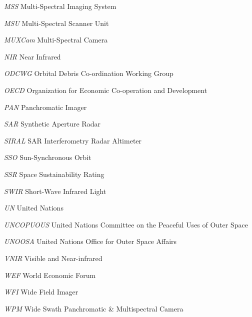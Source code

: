 \documentclass[12pt,a4paper,notitlepage,twoside,openright]{report}
\begin{document}
\begin{abbrv}
\item[\textit{MSS}] Multi-Spectral Imaging System
\item[\textit{MSU}] Multi-Spectral Scanner Unit
\item[\textit{MUXCam}] Multi-Spectral Camera
\item[\textit{NIR}] Near Infrared
\item[\textit{ODCWG}] Orbital Debris Co-ordination Working Group
\item[\textit{OECD}] Organization for Economic Co-operation and Development
\item[\textit{PAN}] Panchromatic Imager
\item[\textit{SAR}] Synthetic Aperture Radar
\item[\textit{SIRAL}] SAR Interferometry Radar Altimeter
\item[\textit{SSO}] Sun-Synchronous Orbit
\item[\textit{SSR}] Space Sustainability Rating
\item[\textit{SWIR}] Short-Wave Infrared Light
\item[\textit{UN}] United Nations
\item[\textit{UNCOPUOUS}] United Nations Committee on the Peaceful Uses of Outer Space
\item[\textit{UNOOSA}] United Nations Office for Outer Space Affairs
\item[\textit{VNIR}] Visible and Near-infrared
\item[\textit{WEF}] World Economic Forum
\item[\textit{WFI}] Wide Field Imager
\item[\textit{WPM}] Wide Swath Panchromatic \& Multispectral Camera
\end{abbrv}
\end{document}
